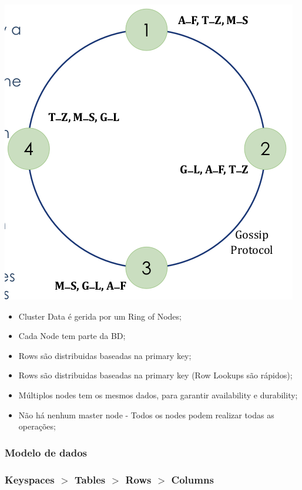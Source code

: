 \documentclass{article}
\begin{document}
\begin{center}
  \includegraphics[scale=0.3]{14}
\end{center}

\begin{itemize}
  \item Cluster Data é gerida por um Ring of Nodes;
  \item Cada Node tem parte da BD;
  \item Rows são distribuidas baseadas na primary key;
  \item Rows são distribuidas baseadas na primary key (Row Lookups são rápidos);
  \item Múltiplos nodes tem os mesmos dados, para garantir availability e durability;
  \item Não há nenhum master node - Todos os nodes podem realizar todas as operações;
\end{itemize}

\pagebreak

\subsubsection{Modelo de dados}
\subsubsection*{Keyspaces $>$ Tables $>$ Rows $>$ Columns}
\end{document}
